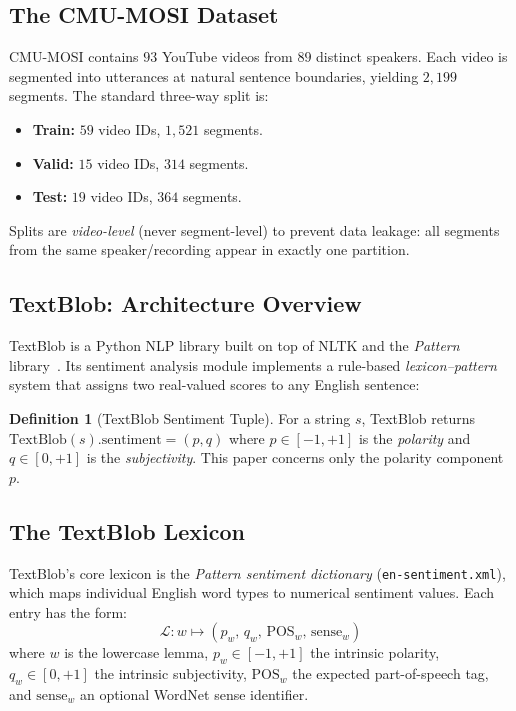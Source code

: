 \documentclass[12pt,a4paper]{article}
\theoremstyle{plain}
\theoremstyle{definition}
\newtheorem{definition}[theorem]{Definition}
\begin{document}
\subsection{The CMU-MOSI Dataset}

CMU-MOSI contains $93$ YouTube videos from $89$ distinct speakers.
Each video is segmented into utterances at natural sentence boundaries,
yielding $2{,}199$ segments.  The standard three-way split is:
\begin{itemize}
  \item \textbf{Train:} $59$ video IDs, $1{,}521$ segments.
  \item \textbf{Valid:} $15$ video IDs, $314$ segments.
  \item \textbf{Test:} $19$ video IDs, $364$ segments.
\end{itemize}

Splits are \emph{video-level} (never segment-level) to prevent data
leakage: all segments from the same speaker/recording appear in
exactly one partition.

\subsection{TextBlob: Architecture Overview}

TextBlob is a Python NLP library built on top of NLTK and the
\emph{Pattern} library~\citep{de2012pattern}.  Its sentiment analysis
module implements a rule-based \emph{lexicon–pattern} system that
assigns two real-valued scores to any English sentence:

\begin{definition}[TextBlob Sentiment Tuple]
\label{def:tb_sentiment}
  For a string $s$, TextBlob returns
  $\text{TextBlob}(s).\text{sentiment} = (p, q)$
  where $p \in [-1,+1]$ is the \emph{polarity} and
  $q \in [0,+1]$ is the \emph{subjectivity}.
  This paper concerns only the polarity component $p$.
\end{definition}

\subsection{The TextBlob Lexicon}

TextBlob's core lexicon is the \emph{Pattern sentiment dictionary}
(\texttt{en-sentiment.xml}), which maps individual English word types
to numerical sentiment values.  Each entry has the form:
\[
  \mathcal{L} : w \mapsto (p_w,\, q_w,\, \text{POS}_w,\,
                            \text{sense}_w)
\]
where $w$ is the lowercase lemma, $p_w \in [-1,+1]$ the intrinsic
polarity, $q_w \in [0,+1]$ the intrinsic subjectivity, $\text{POS}_w$
the expected part-of-speech tag, and $\text{sense}_w$ an optional
WordNet sense identifier.
\end{document}
